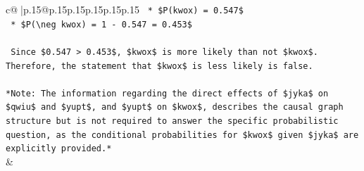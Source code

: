 \documentclass{article}
\begin{document}
{\begin{supertabular}{c@{$\;$}|p{.15\linewidth}@{}p{.15\linewidth}p{.15\linewidth}p{.15\linewidth}p{.15\linewidth}p{.15\linewidth}}
{{{\texttt{    *   \$P(kwox) = 0.547\$} \\
\texttt{    *   \$P(\textbackslash{}neg kwox) = 1 {-} 0.547 = 0.453\$} \\
\\ 
\texttt{    Since \$0.547 > 0.453\$, \$kwox\$ is more likely than not \$kwox\$. Therefore, the statement that \$kwox\$ is less likely is false.} \\
\\ 
\texttt{*Note: The information regarding the direct effects of \$jyka\$ on \$qwiu\$ and \$yupt\$, and \$yupt\$ on \$kwox\$, describes the causal graph structure but is not required to answer the specific probabilistic question, as the conditional probabilities for \$kwox\$ given \$jyka\$ are explicitly provided.*} \\
            }
        }
    }
    & \\ \\


\end{supertabular}}
\end{document}
